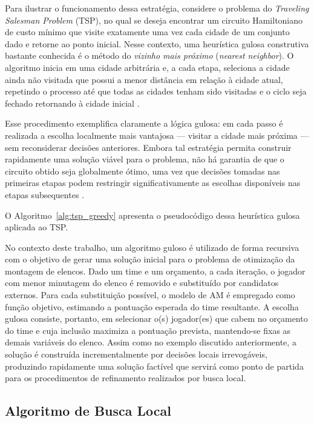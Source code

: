 Para ilustrar o funcionamento dessa estratégia, considere o problema do \textit{Traveling Salesman Problem} (TSP), no qual se deseja encontrar um circuito
Hamiltoniano de custo mínimo que visite exatamente uma vez cada cidade de um conjunto dado e retorne ao ponto inicial. Nesse contexto, uma heurística gulosa
construtiva bastante conhecida é o método do \textit{vizinho mais próximo} (\textit{nearest neighbor}). O algoritmo inicia em uma cidade arbitrária e,
a cada etapa, seleciona a cidade ainda não visitada que possui a menor distância em relação à cidade atual, repetindo o processo até que todas as
cidades tenham sido visitadas e o ciclo seja fechado retornando à cidade inicial \cite{Gendreau2010}.

Esse procedimento exemplifica claramente a lógica gulosa: em cada passo é realizada a escolha localmente mais vantajosa — visitar a cidade mais próxima —
sem reconsiderar decisões anteriores. Embora tal estratégia permita construir rapidamente uma solução viável para o problema, não há garantia de que o
circuito obtido seja globalmente ótimo, uma vez que decisões tomadas nas primeiras etapas podem restringir significativamente as escolhas disponíveis
nas etapas subsequentes \cite{Gendreau2010}.

O Algoritmo~\ref{alg:tsp_greedy} apresenta o pseudocódigo dessa heurística gulosa aplicada ao TSP.



No contexto deste trabalho, um algoritmo guloso é utilizado de forma recursiva com o objetivo de gerar uma solução inicial para o problema de otimização da
montagem de elencos. Dado um time e um orçamento, a cada iteração, o jogador com menor minutagem do elenco é removido e substituído por candidatos externos.
Para cada substituição possível, o modelo de AM é empregado como função objetivo, estimando a pontuação esperada do time resultante. A escolha gulosa
consiste, portanto, em selecionar o(s) jogador(es) que cabem no orçamento do time e cuja inclusão maximiza a pontuação prevista, mantendo-se fixas as
demais variáveis do elenco. Assim como no exemplo discutido anteriormente, a solução é construída incrementalmente por decisões locais irrevogáveis,
produzindo rapidamente uma solução factível que servirá como ponto de partida para os procedimentos de refinamento realizados por busca local.

\subsection{Algoritmo de Busca Local}

